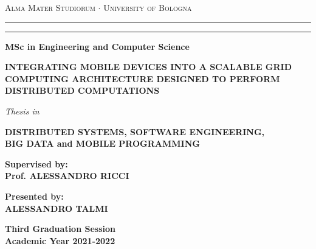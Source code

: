 \begin{titlepage}
    \begin{center}
    {{\Large{
        \textsc{Alma Mater Studiorum $\cdot$ University of Bologna}
    }}}
    \rule[0.1cm]{15.8cm}{0.1mm}
    \rule[0.5cm]{15.8cm}{0.6mm}
    {\small{\bf MSc in Engineering and Computer Science }}
    \vspace{15mm}
    \end{center}
    \begin{center}
        \huge\bf INTEGRATING MOBILE DEVICES INTO A SCALABLE GRID COMPUTING ARCHITECTURE DESIGNED TO PERFORM DISTRIBUTED COMPUTATIONS
    \end{center}
    \vspace{15mm}
    \begin{center}
    {{\emph{Thesis in}}}
    
    \vspace{1mm}
    {{\bf{DISTRIBUTED SYSTEMS, SOFTWARE ENGINEERING,\\BIG DATA and MOBILE PROGRAMMING}}}
    \vspace{18mm}
    \end{center}
    \par
    \noindent
    \begin{minipage}[t]{0.47\textwidth}
    {\large{\bf Supervised by:\\
    Prof. ALESSANDRO RICCI}}
    \end{minipage}
    \hfill
    \begin{minipage}[t]{0.47\textwidth}\raggedleft
    {\large{\bf Presented by:\\
    ALESSANDRO TALMI}}
    \end{minipage}
    \vspace{20mm}
    \begin{center}
    {\large{\bf Third Graduation Session\\
    Academic Year 2021-2022}}
    \end{center}
\end{titlepage}
